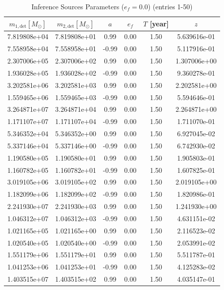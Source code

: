 \documentclass{article}
\begin{document}
\begin{table}[htbp]
\centering
\caption{Inference Sources Parameters ($e_f=0.0$) (entries 1-50)}
\label{tab:inference_sources_ef0_1}
\begin{tabular}{cccccc}
\hline
$m_{1,\mathrm{det}} [M_\odot]$ & $m_{2,\mathrm{det}} [M_\odot]$ & $a$ & $e_f$ & $T$ [year] & $z$ \\
\hline
7.819808e+04 & 7.819808e+01 & 0.99 & 0.00 & 1.50 & 5.639616e-01 \\
7.558958e+04 & 7.558958e+01 & -0.99 & 0.00 & 1.50 & 5.117916e-01 \\
2.307006e+05 & 2.307006e+02 & 0.99 & 0.00 & 1.50 & 1.307006e+00 \\
1.936028e+05 & 1.936028e+02 & -0.99 & 0.00 & 1.50 & 9.360278e-01 \\
3.202581e+06 & 3.202581e+03 & 0.99 & 0.00 & 1.50 & 2.202581e+00 \\
1.559465e+06 & 1.559465e+03 & -0.99 & 0.00 & 1.50 & 5.594646e-01 \\
3.264871e+07 & 3.264871e+04 & 0.99 & 0.00 & 1.50 & 2.264871e+00 \\
1.171107e+07 & 1.171107e+04 & -0.99 & 0.00 & 1.50 & 1.711070e-01 \\
5.346352e+04 & 5.346352e+00 & 0.99 & 0.00 & 1.50 & 6.927045e-02 \\
5.337146e+04 & 5.337146e+00 & -0.99 & 0.00 & 1.50 & 6.742930e-02 \\
1.190580e+05 & 1.190580e+01 & 0.99 & 0.00 & 1.50 & 1.905803e-01 \\
1.160782e+05 & 1.160782e+01 & -0.99 & 0.00 & 1.50 & 1.607825e-01 \\
3.019105e+06 & 3.019105e+02 & 0.99 & 0.00 & 1.50 & 2.019105e+00 \\
1.182099e+06 & 1.182099e+02 & -0.99 & 0.00 & 1.50 & 1.820986e-01 \\
2.241930e+07 & 2.241930e+03 & 0.99 & 0.00 & 1.50 & 1.241930e+00 \\
1.046312e+07 & 1.046312e+03 & -0.99 & 0.00 & 1.50 & 4.631151e-02 \\
1.021165e+05 & 1.021165e+00 & 0.99 & 0.00 & 1.50 & 2.116523e-02 \\
1.020540e+05 & 1.020540e+00 & -0.99 & 0.00 & 1.50 & 2.053991e-02 \\
1.551179e+06 & 1.551179e+01 & 0.99 & 0.00 & 1.50 & 5.511787e-01 \\
1.041253e+06 & 1.041253e+01 & -0.99 & 0.00 & 1.50 & 4.125283e-02 \\
1.403515e+07 & 1.403515e+02 & 0.99 & 0.00 & 1.50 & 4.035147e-01 \\

\end{tabular}
\end{table}
\end{document}
